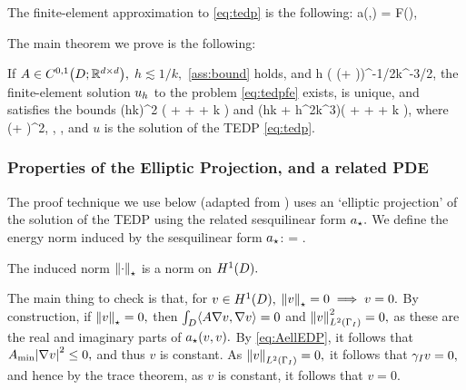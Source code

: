  The finite-element approximation to \eqref{eq:tedp} is the following:
\beq\label{eq:tedpfe}
 \uh \in \Vh\quad \tst\quad a(\uh,\vh) = F(\vh)\quad \tfa \vh \in \Vh,
\eeq
\ede

The main theorem we prove is the following:

\label{thm:febound}
If $A \in \CzoDRRdtd,$ $h \lesssim 1/k,$ \cref{ass:bound} holds, and
\beq\label{eq:hcond}
h \lesssim \mleft( \mleft(\Amax + \half\mright)\CHtell \CHthh\mright)^{-1/2}k^{-3/2}, %
\eeq
the finite-element solution $u_{h}$ to the problem \eqref{eq:tedpfe} exists, is unique, and satisfies the bounds
\beq\label{eq:hherrltbound}
 \lesssim \Cfemo \mleft(hk\mright)^2 \mleft( + \Nunsure{\gI} + \NLtGD{\gradGD \gD} + k \NLtGD{\gD}\mright)
\eeq
and
\beq\label{eq:hherrwbound}
 \lesssim \mleft(\Cfemt hk +  \Cfemth h^2k^3\mright)\mleft( + \Nunsure{\gI} + \NLtGD{\gradGD \gD} + k \NLtGD{\gD}\mright),
\eeq
where
\beqs
\Cfemo \de \mleft(\Amax + \half\mright)\CHthh^2,
\eeqs
\beqs
\Cfemt \de \frac{\Amax+\half}{\Amin} \CHthh,
\eeqs
\beqs
\Cfemth \de {}\Cfemo,
\eeqs
and $u$ is the solution of the TEDP \eqref{eq:tedp}.
\enth

\subsubsection{Properties of the Elliptic Projection, and a related PDE}

The proof technique we use below (adapted from \cite{FeWu:11,ChNi:18}) uses an `elliptic projection' of the solution of the TEDP using the related sesquilinear form $a_{\star}.$ We define the energy norm induced by the sesquilinear form $a_{\star}$:
\beqs
\Npi{\vo} = \sqrt{\abs{\api(\vo,\vo)}}.
\eeqs

\label{lem:inducednorm}
The induced norm $\Npi{\cdot}$ is a norm on $\HoD.$
\ele

The main thing to check is that, for $v \in \HoD,$ $\Npi{v}=0 \implies v=0.$ By construction, if $\Npi{v}=0,$ then $\int_{D} \langle A \nabla v,\nabla v\rangle =0$ and $\NLtGI{v}^2 = 0,$ as these are the real and imaginary parts of $a_{\star}(v,v).$ By \eqref{eq:AellEDP}, it follows that $\Amin \abs{\grad v}^2 \leq 0,$ and thus $v$ is constant. As $\NLtGI{v} = 0,$ it follows that $\gamma_{I} v =0,$ and hence by the trace theorem, as $v$ is constant, it follows that $v=0.$

